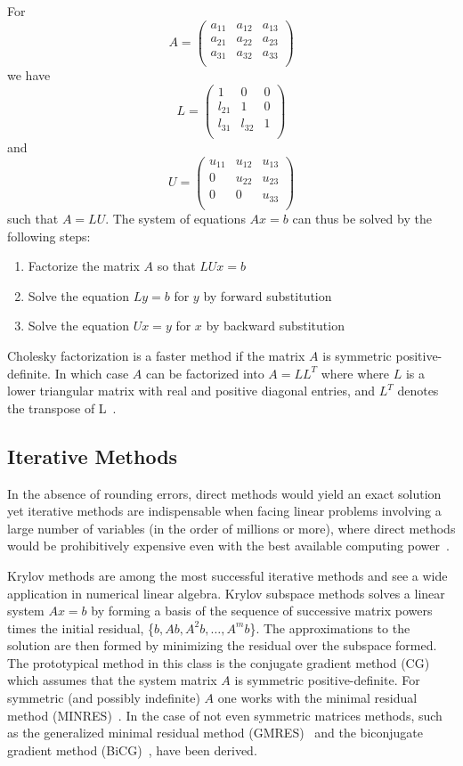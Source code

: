 For $$ A=
\begin{pmatrix}
    a_{11}&a_{12}&a_{13}\\
    a_{21}&a_{22}&a_{23}\\
    a_{31}&a_{32}&a_{33}\\
\end{pmatrix} $$ we have
$$ L=
\begin{pmatrix}
    1      &  0       &  0  \\
    l_{21} &  1       &  0  \\
    l_{31} &  l_{32}  &  1  \\
\end{pmatrix} $$ and $$ U=
\begin{pmatrix}
    u_{11} &  u_{12}  &  u_{13}  \\
    0 &  u_{22}  &  u_{23}  \\
    0 &  0  &  u_{33}  \\
\end{pmatrix} $$ such that $A = LU$. The system of equations $Ax = b$ can thus 
be solved by the following steps:
\begin{enumerate}
    \item Factorize the matrix $A$ so that $LUx = b$
    \item Solve the equation $Ly = b$ for $y$ by forward substitution
    \item Solve the equation $Ux = y$ for $x$ by backward substitution
\end{enumerate}

Cholesky factorization is a faster method if the matrix $A$ is symmetric 
positive-definite. In which case $A$ can be factorized into $A = LL^T$ where 
where $L$ is a lower triangular matrix with real and positive diagonal entries, 
and $L^T$ denotes the transpose of L~\cite{nla}.

\subsection{Iterative Methods}
In the absence of rounding errors, direct methods would yield an exact solution 
yet iterative methods are indispensable when facing linear problems involving a 
large number of variables (in the order of millions or more), where direct 
methods would be prohibitively expensive even with the best available computing 
power~\cite{nla}. 

Krylov methods are among the most successful iterative methods and see a wide 
application in numerical linear algebra. Krylov subspace methods solves a linear 
system $Ax = b$ by forming a basis of the sequence of successive matrix powers 
times the initial residual, \{$b, Ab, A^2b, \ldots, A^mb$\}. The approximations 
to the solution are then formed by minimizing the residual over the subspace 
formed. The prototypical method in this class is the conjugate gradient method 
(CG)~\cite{cg} which assumes that the system matrix $A$ is symmetric 
positive-definite. For symmetric (and possibly indefinite) $A$ one works with 
the minimal residual method (MINRES)~\cite{minres}. In the case of not even 
symmetric matrices methods, such as the generalized minimal residual method 
(GMRES)~\cite{gmres} and the biconjugate gradient method (BiCG)~\cite{bicg}, 
have been derived.

